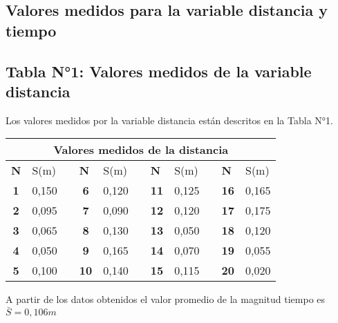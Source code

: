 \documentclass[runningheads]{llncs}
\begin{document}
    \subsection{Valores medidos para la variable distancia y tiempo} 
    \subsection*{Tabla N°1: Valores medidos de la variable distancia}
    Los valores medidos por la variable distancia están descritos en la Tabla N°1. \\
    \begin{table}[]
        \centering
        \begin{tabular}{crlcrlcrlcr}
        \hline
        \multicolumn{11}{c}{\textbf{Valores medidos de la distancia}} \\ \hline
        \multicolumn{1}{l}{\textbf{N}} & \multicolumn{1}{l}{S(m)} &  & \multicolumn{1}{l}{\textbf{N}} & \multicolumn{1}{l}{S(m)} &  & \multicolumn{1}{l}{\textbf{N}} & \multicolumn{1}{l}{S(m)} &  & \multicolumn{1}{l}{\textbf{N}} & \multicolumn{1}{l}{S(m)} \\ \hline
        \textbf{1} & 0,150 &  & \textbf{6} & 0,120 &  & \textbf{11} & 0,125 &  & \textbf{16} & 0,165 \\
        \textbf{2} & 0,095 &  & \textbf{7} & 0,090 &  & \textbf{12} & 0,120 &  & \textbf{17} & 0,175 \\
        \textbf{3} & 0,065 &  & \textbf{8} & 0,130 &  & \textbf{13} & 0,050 &  & \textbf{18} & 0,120 \\
        \textbf{4} & 0,050 &  & \textbf{9} & 0,165 &  & \textbf{14} & 0,070 &  & \textbf{19} & 0,055 \\
        \textbf{5} & 0,100 &  & \textbf{10} & 0,140 &  & \textbf{15} & 0,115 &  & \textbf{20} & 0,020 \\ \hline
        \end{tabular}
        \end{table}
    A partir de los datos obtenidos el valor promedio de la magnitud tiempo es $\bar{S}=0,106m$
\end{document}
